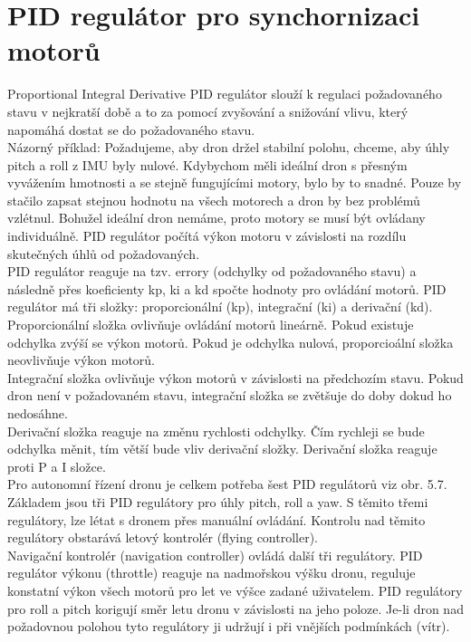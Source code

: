 \section{PID regulátor pro synchornizaci motorů} 
Proportional Integral Derivative
PID regulátor slouží k regulaci požadovaného stavu v nejkratší době a to za pomocí zvyšování a snižování vlivu, který napomáhá dostat se do požadovaného stavu.\\
Názorný příklad:
Požadujeme, aby dron držel stabilní polohu, chceme, aby úhly pitch a roll z IMU byly nulové. Kdybychom měli ideální dron s přesným vyvážením hmotnosti a se stejně fungujícími motory, bylo by to snadné. Pouze by stačilo zapsat stejnou hodnotu na všech motorech a dron by bez problémů vzlétnul. Bohužel ideální dron nemáme, proto motory se musí být ovládany individuálně. PID regulátor počítá výkon motoru v závislosti na rozdílu skutečných úhlů od požadovaných.\\
PID regulátor reaguje na tzv. errory (odchylky od požadovaného stavu) a následně přes koeficienty kp, ki a kd spočte hodnoty pro ovládání motorů.
PID regulátor má tři složky: proporcionální (kp), integrační (ki) a derivační (kd).\\
Proporcionální složka ovlivňuje ovládání motorů lineárně. Pokud existuje odchylka zvýší se výkon motorů. Pokud je odchylka nulová, proporcioální složka neovlivňuje výkon motorů.\\
Integrační složka ovlivňuje výkon motorů v závislosti na předchozím stavu. Pokud dron není v požadovaném stavu, integrační složka se zvětšuje do doby dokud ho nedosáhne.\\
Derivační složka reaguje na změnu rychlosti odchylky. Čím rychleji se bude odchylka měnit, tím větší bude vliv derivační složky. Derivační složka reaguje proti P a I složce.\\
Pro autonomní řízení dronu je celkem potřeba šest PID regulátorů viz obr. 5.7. Základem jsou tři PID regulátory pro úhly pitch, roll a yaw. S těmito třemi regulátory, lze létat s dronem přes manuální ovládání. Kontrolu  nad těmito regulátory obstarává letový kontrolér (flying controller).\\
Navigační kontrolér (navigation controller) ovládá další tři regulátory. PID regulátor výkonu (throttle) reaguje na nadmořskou výšku dronu, reguluje konstatní výkon všech motorů pro let ve výšce zadané uživatelem. PID regulátory pro roll a pitch korigují směr letu dronu v závislosti na jeho poloze. Je-li dron nad požadovnou polohou tyto regulátory ji udržují i při vnějších podmínkách (vítr).\cite{pid} \cite{hacksterpid}\\
